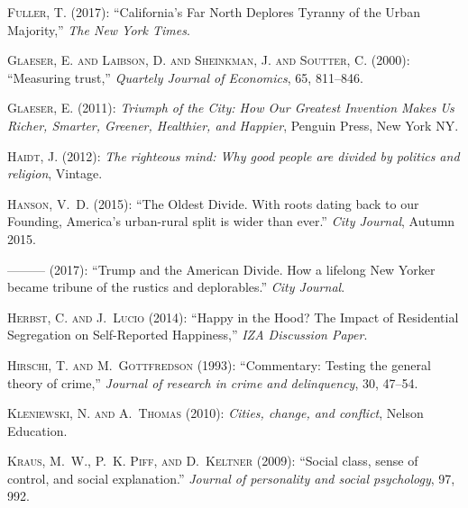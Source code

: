 \documentclass[11pt, letterpaper]{article}
\begin{document}
\begin{spacing}{1.4}
\begin{thebibliography}{92}
\textsc{Fuller, T.} (2017): \enquote{California's Far North Deplores Tyranny of
  the Urban Majority,} \emph{The New York Times}.
     
\textsc{Glaeser, E. and Laibson, D. and Sheinkman, J. and Soutter, C.} (2000): \enquote{Measuring trust,} \emph{Quartely Journal of Economics}, 65, 811--846.

\textsc{Glaeser, E.} (2011): \emph{Triumph of the City: How Our Greatest
  Invention Makes Us Richer, Smarter, Greener, Healthier, and Happier}, Penguin
  Press, New York NY.

\textsc{Haidt, J.} (2012): \emph{The righteous mind: Why good people are
  divided by politics and religion}, Vintage.

\textsc{Hanson, V.~D.} (2015): \enquote{The Oldest Divide. With roots dating
  back to our Founding, America's urban-rural split is wider than ever.}
  \emph{City Journal}, Autumn 2015.

---\hspace{-.1pt}---\hspace{-.1pt}--- (2017): \enquote{Trump and the American
  Divide. How a lifelong New Yorker became tribune of the rustics and
  deplorables.} \emph{City Journal}.

\textsc{Herbst, C. and J.~Lucio} (2014): \enquote{Happy in the Hood? The Impact
  of Residential Segregation on Self-Reported Happiness,} \emph{IZA Discussion
  Paper}.

\textsc{Hirschi, T. and M.~Gottfredson} (1993): \enquote{Commentary: Testing
  the general theory of crime,} \emph{Journal of research in crime and
  delinquency}, 30, 47--54.

\textsc{Kleniewski, N. and A.~Thomas} (2010): \emph{Cities, change, and
  conflict}, Nelson Education.

\textsc{Kraus, M.~W., P.~K. Piff, and D.~Keltner} (2009): \enquote{Social
  class, sense of control, and social explanation.} \emph{Journal of
  personality and social psychology}, 97, 992.


\end{thebibliography}
\end{spacing}
\end{document}

